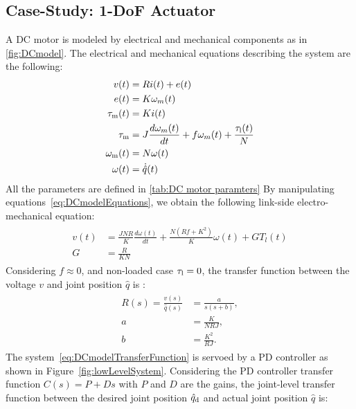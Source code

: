 \subsection{Case-Study: 1-DoF Actuator}
A DC motor is modeled by electrical and mechanical components as in \cref{fig:DCmodel}. The electrical and mechanical equations describing the system are the following:
\begin{align}\label{eq:DCmodelEquations}
	\begin{split}
		v(t) &=  Ri(t) + e(t)\\
		e(t) &= K\omega_m(t)\\
		\tau_{\rm m}(t) &=Ki(t) \\
		\tau_{\rm m}&=J\frac{d\omega_m(t)}{dt} + f\omega_m(t) + \frac{\tau_{\rm l}(t)}{N}\\
		\omega_{\rm m}(t) &= N\omega(t)\\
		\omega(t) & = \dot{\hat{q}}(t)
	\end{split}
\end{align}
All the parameters are defined in \cref{tab:DC motor paramters} 
By manipulating equations~\eqref{eq:DCmodelEquations}, we obtain the following link-side electro-mechanical equation:
\begin{align}\label{eq:electroMecanicEquation}
	\begin{split}
		v(t) &= \frac{JNR}{K}\frac{d\omega(t)}{dt} + \frac{N(Rf + K^2)}{K}\omega(t) + GT_l(t)\\
		G &= \frac{R}{KN}
	\end{split}
\end{align} 
Considering $f\approx0$, and non-loaded case $\tau_{\rm l}=0$, the transfer function between the voltage $v$ and joint position $\hat{q}$ is :
\begin{align}\label{eq:DCmodelTransferFunction}
	\begin{split}
		R(s)=\frac{v(s)}{\hat{q}(s)}& = \frac{a}{s(s + b)},\\
		a & = \frac{K}{NRJ},\\
		b & = \frac{ K^2}{RJ}.
	\end{split}
\end{align}
The system~\eqref{eq:DCmodelTransferFunction} is servoed by a PD controller as shown in Figure~\ref{fig:lowLevelSystem}. Considering the PD controller transfer function $C(s) = P + Ds$ with $P$ and $D$ are the gains, the joint-level transfer function between the desired joint position $\hat{q}_{\rm d}$ and actual joint position $\hat{q}$ is: 
